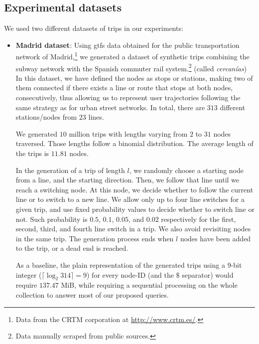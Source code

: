 	\subsection{Experimental datasets}
	\label{sec:ctr:exp:data}
	We used two different datasets of trips in our experiments:
	\begin{itemize}
	
	  \item {\bf Madrid dataset}:
	  Using \gls{gtfs} data obtained for the public transportation network of 
	  {Madrid},\footnote{Data from
	  the CRTM corporation at \url{http://www.crtm.es/}.} we generated a dataset of 
	  synthetic trips combining the subway network with the Spanish commuter rail system.\footnote{Data manually scraped from public sources.} (called {\em cercan\'ias})
	  In this dataset, we have defined the nodes as stops or stations, making two of them connected if there exists a line or route that stops at both nodes, consecutively, thus allowing us to represent user trajectories following the same strategy as for urban street networks.
	  In total, there are $313$ different stations/nodes from $23$ lines.
	 
	We generated $10$ million trips with lengths varying from $2$ to $31$ nodes traversed. Those lengths follow a binomial 
	distribution. The average length of the trips is $11.81$ nodes. 
	
	In the generation of a trip of length $l$, we randomly choose a starting node from a line, and the starting direction. 
	Then, we follow that line until we reach a switching node. At this node, we decide whether to follow the current 
	line or to switch to a new line. We allow only up to four line switches for a given trip, and use fixed probability 
	values to decide whether to switch line or not. Such probability is $0.5$, $0.1$, $0.05$, and $0.02$ respectively 
	for the first, second, third, and fourth line switch in a trip. 
	We also avoid revisiting nodes in the same trip. 
	The generation process ends when $l$ nodes have been added to the trip, or a dead end is reached.

	As a baseline, the plain representation of the generated trips using a $9$-bit integer ($\lceil\log_2 314\rceil= 9$) 
	for every node-ID (and the $\$$ separator) would require $137.47$ MiB, while requiring a sequential processing on the whole collection to answer most of our proposed queries.
	 

\end{itemize}
